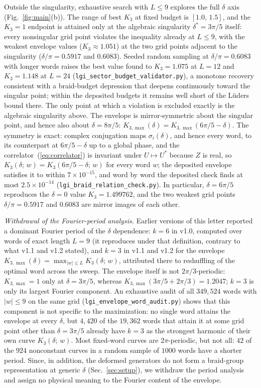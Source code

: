 \documentclass[aps,prx,reprint,amsmath,amssymb,floatfix,nofootinbib,superscriptaddress]{revtex4-2}
\begin{document}
Outside the singularity, exhaustive search with $L \leq 9$ explores
the full $\delta$ axis (Fig.~\ref{fig:main}(b)). The range of best
$K_{3}$ at fixed budget is $[1.0,\, 1.5]$, and the $K_{3} = 1$
endpoint is attained only at the algebraic singularity
$\delta^{\ast} = 3\pi/5$ itself: every nonsingular grid point violates
the inequality already at $L \leq 9$, with the weakest
envelope values ($K_{3} \approx 1.051$) at the two grid points
adjacent to the singularity ($\delta/\pi = 0.5917$ and $0.6083$).
Seeded random sampling at $\delta/\pi = 0.6083$ with longer words
raises the best value found to $K_{3} = 1.075$ at $L = 12$ and
$K_{3} = 1.148$ at $L = 24$
(\texttt{lgi\_sector\_budget\_validator.py}), a monotone recovery
consistent with a braid-budget depression that deepens continuously
toward the singular point; within the deposited budgets it remains
well short of the L\"uders bound there. The only point at which a
violation is excluded exactly is the algebraic singularity above. The
envelope is mirror-symmetric about the singular point, and hence also
about $\delta = 8\pi/5$: $K_{3,\max}(\delta) = K_{3,\max}(6\pi/5 -
\delta)$. The symmetry is exact: complex conjugation maps
$\sigma_{i}(\delta)$, and hence every word, to its counterpart at
$6\pi/5 - \delta$ up to a global phase, and the
correlator~(\ref{eq:correlator}) is invariant under $U \mapsto U^{\ast}$
because $Z$ is real, so $K_{3}(\delta;\,w) = K_{3}(6\pi/5 - \delta;\,w)$
for every word $w$; the deposited envelope satisfies it to within
$7\times 10^{-15}$, and word by word the deposited check finds at most
$2.5\times 10^{-14}$ (\texttt{lgi\_braid\_relation\_check.py}).
In particular, $\delta = 6\pi/5$ reproduces the $\delta = 0$ value
$K_{3} = 1.499762$, and the two weakest grid points $\delta/\pi =
0.5917$ and $0.6083$ are mirror images of each other.

\emph{Withdrawal of the Fourier-period analysis.} Earlier versions of
this letter reported a dominant Fourier period of the $\delta$
dependence: $k=6$ in v1.0, computed over words of exact length
$L = 9$ (it reproduces under that definition, contrary to what v1.1
and v1.2 stated), and $k=3$ in v1.1 and v1.2 for the envelope
$K_{3,\max}(\delta) = \max_{|w| \leq L} K_{3}(\delta;\,w)$,
attributed there to reshuffling of the optimal word across the sweep.
The envelope itself is not $2\pi/3$-periodic: $K_{3,\max} = 1$ only
at $\delta = 3\pi/5$, whereas $K_{3,\max}(3\pi/5 + 2\pi/3) = 1.2047$;
$k=3$ is only its largest Fourier component. An exhaustive audit of
all $349{,}524$ words with $|w| \leq 9$ on the same grid
(\texttt{lgi\_envelope\_word\_audit.py}) shows that this component is
not specific to the maximization: no single word attains the envelope
at every $\delta$, but $4{,}420$ of the $19{,}362$ words that attain
it at some grid point other than $\delta = 3\pi/5$ already have $k=3$
as the strongest harmonic of their own curve $K_{3}(\delta;\,w)$.
Most fixed-word curves are $2\pi$-periodic, but not all: $42$ of the
$924$ nonconstant curves in a random sample of $1000$ words have a
shorter period. Since, in addition, the deformed generators do not
form a braid-group representation at generic $\delta$
(Sec.~\ref{sec:setup}), we withdraw the period analysis and assign no
physical meaning to the Fourier content of the envelope.
\end{document}
